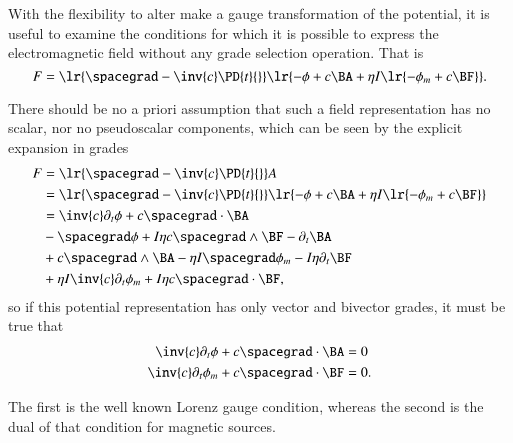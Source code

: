 %
%
With the flexibility to alter make a gauge transformation of the potential, it is useful to examine the conditions for which it is possible to express the electromagnetic field without any grade selection operation.
That is
\begin{dmath}\label{eqn:potentialSection_LorenzGauge:1720}
F
=
\lr{ \spacegrad - \inv{c} \PD{t}{} }
\lr{
      - \phi
      + c \BA
      + \eta I \lr{ -\phi_m + c \BF }
}.
\end{dmath}

There should be no a priori assumption that such a field representation has no scalar, nor no pseudoscalar components, which can be seen by the explicit expansion in grades
\begin{dmath}\label{eqn:potentialSection_LorenzGauge:1640}
\begin{aligned}
F
&=
\lr{ \spacegrad - \inv{c} \PD{t}{} } A \\
&=
\lr{ \spacegrad - \inv{c} \PD{t}{} } \lr{ -\phi + c \BA + \eta I \lr{ -\phi_m + c \BF } } \\
&=
\inv{c} \partial_t \phi
+ c \spacegrad \cdot \BA  \\
&-\spacegrad \phi
+ I \eta c \spacegrad \wedge \BF
- \partial_t \BA  \\
&+ c \spacegrad \wedge \BA
- \eta I \spacegrad \phi_m
- I \eta \partial_t \BF \\
&+ \eta I \inv{c} \partial_t \phi_m
+ I \eta c \spacegrad \cdot \BF,
\end{aligned}
\end{dmath}
so if this potential representation has only vector and bivector grades, it must be true that
\begin{dmath}\label{eqn:potentialSection_LorenzGauge:1660}
\begin{aligned}
\inv{c} \partial_t \phi + c \spacegrad \cdot \BA &= 0 \\
\inv{c} \partial_t \phi_m + c \spacegrad \cdot \BF &= 0.
\end{aligned}
\end{dmath}

The first is the well known Lorenz gauge condition, whereas the second is the dual of that condition for magnetic sources.

